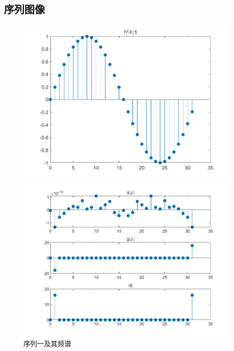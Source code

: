 \documentclass{../source/zjureport}
\begin{document}
        \subsection{序列图像}
            \begin{figure}[H]
                \centering
                \begin{minipage}[t]{0.48\textwidth}
                \centering
                \includegraphics[width=\textwidth]{figure/序列1.png}
                \end{minipage}
                \begin{minipage}[t]{0.48\textwidth}
                \centering
                \includegraphics[width=\textwidth]{figure/频谱_序列1.png}
                \end{minipage}
                \caption{序列一及其频谱}
            \end{figure}
\end{document}
